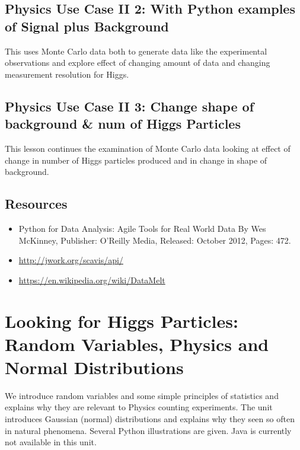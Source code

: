 \subsection{Physics Use Case II 2: With Python examples of Signal
plus
Background}\label{physics-use-case-ii-3-with-python-examples-of-signal-plus-background}

This uses Monte Carlo data both to generate data like the experimental
observations and explore effect of changing amount of data and changing
measurement resolution for Higgs.


\subsection{Physics Use Case II 3: Change shape of background \&
  num of Higgs Particles}

This lesson continues the examination of Monte Carlo data looking at
effect of change in number of Higgs particles produced and in change in
shape of background.


\subsection{Resources}\label{resources-1}

\begin{itemize}

\item
  Python for Data Analysis: Agile Tools for Real World Data By Wes
  McKinney, Publisher: O'Reilly Media, Released: October 2012, Pages:
  472.
\item
  \url{http://jwork.org/scavis/api/}
\item
  \url{https://en.wikipedia.org/wiki/DataMelt}
\end{itemize}

\section{Looking for Higgs Particles: Random Variables, Physics and
Normal
Distributions}\label{looking-for-higgs-particles-random-variables-physics-and-normal-distributions}

We introduce random variables and some simple principles of statistics
and explains why they are relevant to Physics counting experiments. The
unit introduces Gaussian (normal) distributions and explains why they
seen so often in natural phenomena. Several Python illustrations are
given. Java is currently not available in this unit.

